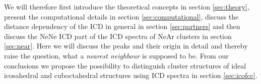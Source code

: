 We will
therefore first introduce the theoretical concepts in section \ref{sec:theory},
present the computational details in section \ref{sec:computational},
discuss the distance dependency of the ICD in general
in section \ref{sec:partners} and then
discuss the NeNe ICD part of the ICD spectra of NeAr clusters
\cite{Fasshauer14_1} in section \ref{sec:near}. Here we will discuss the
peaks and their origin in detail and thereby
raise the question, what a \emph{nearest neighbour} is supposed to be. From
our conclusions we propose the possibility to distinguish cluster structures
of ideal icosahedral and cuboctahedral structures using ICD spectra in
section \ref{sec:icofcc}.

